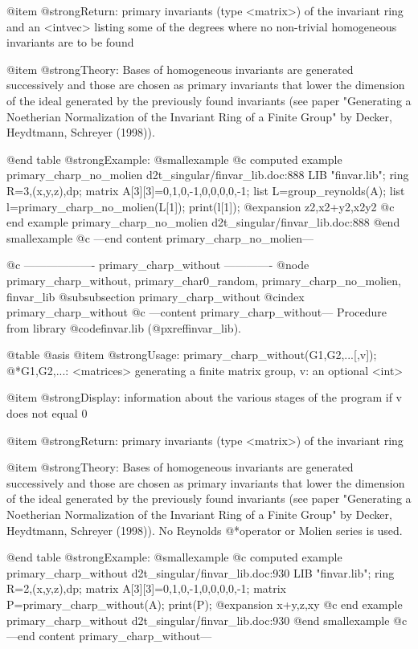 @item @strong{Return:}
primary invariants (type <matrix>) of the invariant ring and an
<intvec> listing some of the degrees where no non-trivial homogeneous
invariants are to be found

@item @strong{Theory:}
Bases of homogeneous invariants are generated successively and those
are chosen as primary invariants that lower the dimension of the ideal
generated by the previously found invariants (see paper "Generating a
Noetherian Normalization of the Invariant Ring of a Finite Group" by
Decker, Heydtmann, Schreyer (1998)).

@end table
@strong{Example:}
@smallexample
@c computed example primary_charp_no_molien d2t_singular/finvar_lib.doc:888 
LIB "finvar.lib";
ring R=3,(x,y,z),dp;
matrix A[3][3]=0,1,0,-1,0,0,0,0,-1;
list L=group_reynolds(A);
list l=primary_charp_no_molien(L[1]);
print(l[1]);
@expansion{} z2,x2+y2,x2y2
@c end example primary_charp_no_molien d2t_singular/finvar_lib.doc:888
@end smallexample
@c ---end content primary_charp_no_molien---

@c ------------------- primary_charp_without -------------
@node primary_charp_without, primary_char0_random, primary_charp_no_molien, finvar_lib
@subsubsection primary_charp_without
@cindex primary_charp_without
@c ---content primary_charp_without---
Procedure from library @code{finvar.lib} (@pxref{finvar_lib}).

@table @asis
@item @strong{Usage:}
primary_charp_without(G1,G2,...[,v]);
@*G1,G2,...: <matrices> generating a finite matrix group, v: an optional
<int>

@item @strong{Display:}
information about the various stages of the program if v does not
equal 0

@item @strong{Return:}
primary invariants (type <matrix>) of the invariant ring

@item @strong{Theory:}
Bases of homogeneous invariants are generated successively and those
are chosen as primary invariants that lower the dimension of the ideal
generated by the previously found invariants (see paper "Generating a
Noetherian Normalization of the Invariant Ring of a Finite Group" by
Decker, Heydtmann, Schreyer (1998)). No Reynolds
@*operator or Molien series is used.

@end table
@strong{Example:}
@smallexample
@c computed example primary_charp_without d2t_singular/finvar_lib.doc:930 
LIB "finvar.lib";
ring R=2,(x,y,z),dp;
matrix A[3][3]=0,1,0,-1,0,0,0,0,-1;
matrix P=primary_charp_without(A);
print(P);
@expansion{} x+y,z,xy
@c end example primary_charp_without d2t_singular/finvar_lib.doc:930
@end smallexample
@c ---end content primary_charp_without---

